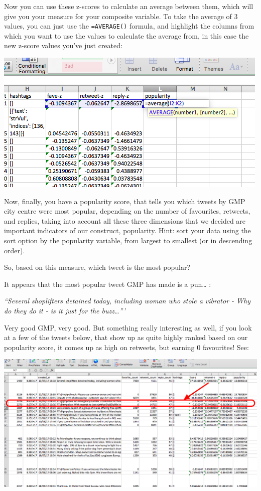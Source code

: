 \documentclass[]{book}
\theoremstyle{definition}
\theoremstyle{definition}
\theoremstyle{definition}
\theoremstyle{remark}
\begin{document}
Now you can use these z-scores to calculate an average between them,
which will give you your measure for your composite variable. To take
the average of 3 values, you can just use the \texttt{=AVERAGE()}
formula, and highlight the columns from which you want to use the values
to calculate the average from, in this case the new z-score values
you've just created:

\includegraphics{imgs/calc_popul.png}

Now, finally, you have a popularity score, that tells you which tweets
by GMP city centre were most popular, depending on the number of
favourites, retweets, and replies, taking into account all these three
dimensions that we decided are important indicators of our construct,
popularity. Hint: sort your data using the sort option by the popularity
variable, from largest to smallest (or in descending order).

So, based on this measure, which tweet is the most popular?

It appears that the most popular tweet GMP has made is a pun\ldots{} :

\emph{``Several shoplifters detained today, including woman who stole a
vibrator - Why do they do it - is it just for the buzz\ldots{}'''}

Very good GMP, very good. But something really interesting as well, if
you look at a few of the tweets below, that show up as quite highly
ranked based on our popularity score, it comes up as high on retweets,
but earning 0 favourites! See:

\includegraphics{imgs/low_fave_high_rt.png}
\end{document}
